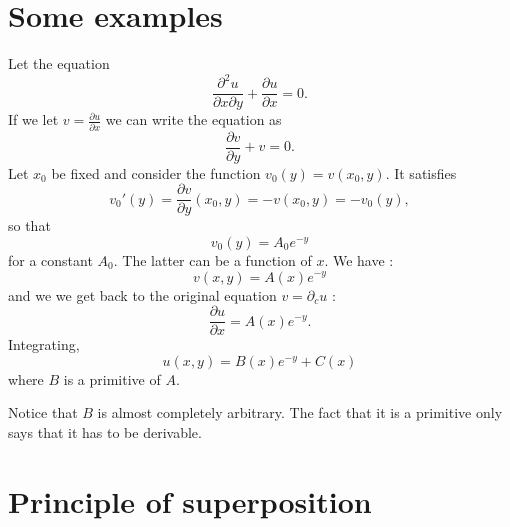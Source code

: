 \section{Some examples}

Let the equation
\begin{equation}
    \frac{ \partial^2u }{ \partial x\partial y }+\frac{ \partial u }{ \partial x }=0.
\end{equation}
If we let \( v=\frac{ \partial u }{ \partial x }\) we can write the equation as
\begin{equation}
    \frac{ \partial v }{ \partial y }+v=0.
\end{equation}
Let \( x_0\) be fixed and consider the function \( v_0(y)=v(x_0,y)\). It satisfies
\begin{equation}
    v_0'(y)=\frac{ \partial v }{ \partial y }(x_0,y)=-v(x_0,y)=-v_0(y), 
\end{equation}
so that
\begin{equation}
    v_0(y)=A_0 e^{-y}
\end{equation}
for a constant \( A_0\). The latter can be a function of \( x\). We have :
\begin{equation}
    v(x,y)=A(x) e^{-y}
\end{equation}
and we we get back to the original equation \( v=\partial_cu\) :
\begin{equation}
    \frac{ \partial u }{ \partial x }=A(x) e^{-y}.
\end{equation}
Integrating,
\begin{equation}
    u(x,y)=B(x) e^{-y}+C(x)
\end{equation}
where \( B\) is a primitive of \( A\).

Notice that \( B\) is almost completely arbitrary. The fact that it is a primitive only says that it has to be derivable.

\section{Principle of superposition}

